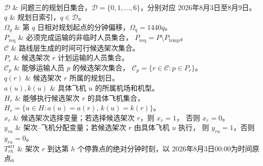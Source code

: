 
\midrule
{} \\[2pt]

$\mathcal{D}$
& 问题三的规划日集合，$\mathcal{D}=\{0,1,\ldots,6\}$，分别对应
2026年8月3日至8月9日。 \\

$q$
& 规划日索引，$q\in\mathcal{D}$。 \\

$\Omega_q$
& 第 $q$ 日相对规划起点的分钟偏移，$\Omega_q=1440q$。 \\

$P_{\mathrm{req}}$
& 必须完成运输的非临时人员集合，
$P_{\mathrm{req}}=P\setminus P_{\mathrm{temp}}$。 \\

$\mathcal{C}$
& 路线层生成的时间可行候选架次集合。 \\

$P_r$
& 候选架次 $r$ 计划运输的人员集合。 \\

$\mathcal{C}_p$
& 能够运输人员 $p$ 的候选架次集合，
$\mathcal{C}_p=\{r\in\mathcal{C}:p\in P_r\}$。 \\

$q(r)$
& 候选架次 $r$ 所属的规划日。 \\

$a(u),k(u)$
& 具体飞机 $u$ 的所属机场和机型。 \\

$H_r$
& 能够执行候选架次 $r$ 的具体飞机集合，
$H_r=\{u\in H:a(u)=a(r),\,k(u)=k(r)\}$。 \\

$x_r$
& 候选架次选择变量；若选择候选架次 $r$，则 $x_r=1$，
否则 $x_r=0$。 \\

$y_{ru}$
& 架次--飞机分配变量；若候选架次 $r$ 由具体飞机 $u$ 执行，
则 $y_{ru}=1$，否则 $y_{ru}=0$。 \\

$T_{rh}^{\mathrm{arr}}$
& 架次 $r$ 到达第 $h$ 个停靠点的绝对分钟时刻，以
2026年8月3日00:00为时间原点。 \\

